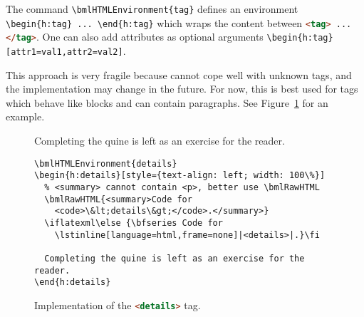 \documentclass[a4paper,british]{article}
\def\ltxinline{\lstinline[style=bookml]}
\def\htmlinline{\lstinline[language=html]}
\begin{document}
The command \ltxinline|\bmlHTMLEnvironment{tag}| defines an environment \ltxinline|\begin{h:tag} ... \end{h:tag}| which wraps the content between \lstinline[language=html,frame=none]|<tag> ... </tag>|. One can also add attributes as optional arguments \ltxinline|\begin{h:tag}[attr1=val1,attr2=val2]|.

This approach is very fragile because \LaTeXML{} cannot cope well with unknown tags, and the implementation may change in the future. For now, this is best used for tags which behave like blocks and can contain paragraphs. See Figure~\ref{fig:details} for an example.

  \begin{figure}
    \begin{h:details}[style={text-align: left; width: 100\%}]
      \iflatexml{}\fi

      Completing the quine is left as an exercise for the reader.
      \begin{lstlisting}[style=bookml]
\bmlHTMLEnvironment{details}
\begin{h:details}[style={text-align: left; width: 100\%}]
  % <summary> cannot contain <p>, better use \bmlRawHTML
  \bmlRawHTML{<summary>Code for
    <code>\&lt;details\&gt;</code>.</summary>}
  \iflatexml\else {\bfseries Code for
    \lstinline[language=html,frame=none]|<details>|.}\fi

  Completing the quine is left as an exercise for the reader.
\end{h:details}
          \end{lstlisting}
    \end{h:details}
    \caption{Implementation of the \htmlinline|<details>| tag.}
    \label{fig:details}
  \end{figure}
\end{document}
